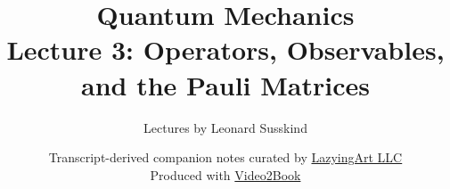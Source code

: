 \documentclass[11pt,oneside]{book}
\begin{document}
\hypersetup{pageanchor=false}
\frontmatter
\title{Quantum Mechanics\\[0.45em]
\large Lecture 3: Operators, Observables, and the Pauli Matrices}
\author{Lectures by Leonard Susskind}
\date{Transcript-derived companion notes curated by
\href{https://lazying.art}{LazyingArt LLC}\\[0.35em]
\small Produced with
\href{https://github.com/lachlanchen/Video2Book}{Video2Book}}
\maketitle
\hypersetup{pageanchor=true}
\mainmatter

\end{document}
